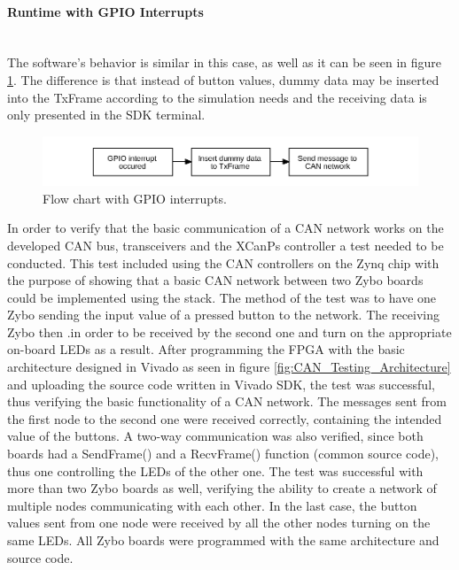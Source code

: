 \paragraph*{Runtime with GPIO Interrupts}~\\
The software's behavior is similar in this case, as well as it can be seen in figure \ref{fig:FlowChart_CANSoft_GPIOIntr}.
The difference is that instead of button values, dummy data may be inserted into the TxFrame according to the simulation needs and the receiving data is only presented in the SDK terminal.
\begin{figure}[h!]
	\centering
	\includegraphics[width = 1\linewidth]{graphics/FlowChart_CANSoft_GPIOIntr.pdf}
	\caption{Flow chart with GPIO interrupts.}
	\label{fig:FlowChart_CANSoft_GPIOIntr}
\end{figure}


In order to verify that the basic communication of a CAN network works on the developed CAN bus, transceivers and the XCanPs controller a test needed to be conducted.
This test included using the CAN controllers on the Zynq chip with the purpose of showing that a basic CAN network between two Zybo boards could be implemented using the stack.
The method of the test was to have one Zybo sending the input value of a pressed button to the network.
The receiving Zybo then 
 .in order to be received by the second one and turn on the appropriate on-board LEDs as a result.
After programming the FPGA with the basic architecture designed in Vivado as seen in figure \ref{fig:CAN_Testing_Architecture} and uploading the source code written in Vivado SDK, the test was successful, thus verifying the basic functionality of a CAN network.
The messages sent from the first node to the second one were received correctly, containing the intended value of the buttons.
A two-way communication was also verified, since both boards had a SendFrame() and a RecvFrame() function (common source code), thus one controlling the LEDs of the other one.
The test was successful with more than two Zybo boards as well, verifying the ability to create a network of multiple nodes communicating with each other.
In the last case, the button values sent from one node were received by all the other nodes turning on the same LEDs.
All Zybo boards were programmed with the same architecture and source code.

